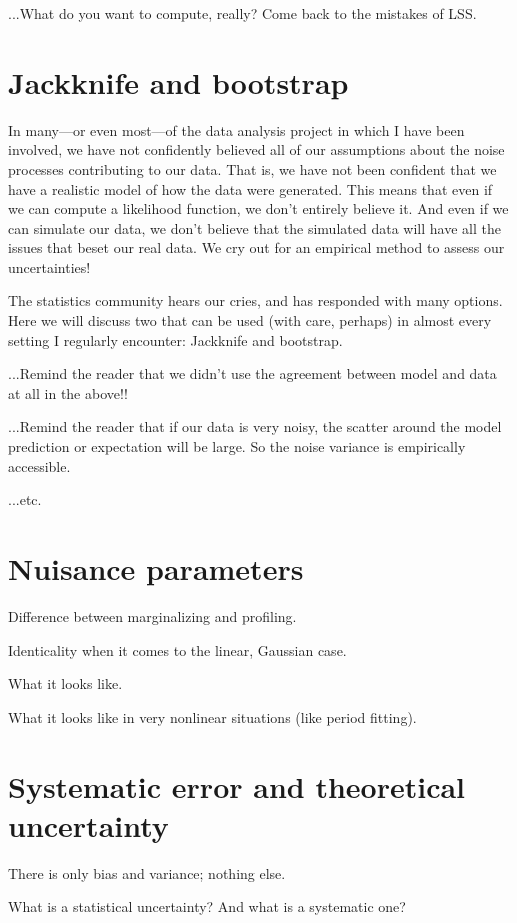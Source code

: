 \documentclass[10pt]{article}
\begin{document}
...What do you want to compute, really? Come back to the mistakes of LSS.

\section{Jackknife and bootstrap}\label{sec:empirical}

In many---or even most---of the data analysis project in which I have been
involved, we have not confidently believed all of our assumptions about the
noise processes contributing to our data.
That is, we have not been confident that we have a realistic model of how
the data were generated.
This means that even if we can compute a likelihood function, we don't entirely
believe it.
And even if we can simulate our data, we don't believe that the simulated data
will have all the issues that beset our real data.
We cry out for an empirical method to assess our uncertainties!

The statistics community hears our cries, and has responded with many options.
Here we will discuss two that can be used (with care, perhaps) in almost every
setting I regularly encounter: Jackknife and bootstrap.

...Remind the reader that we didn't use the agreement between model and data
at all in the above!!

...Remind the reader that if our data is very noisy, the scatter around the
model prediction or expectation will be large. So the noise variance is empirically
accessible.

...etc.

\section{Nuisance parameters}

Difference between marginalizing and profiling.

Identicality when it comes to the linear, Gaussian case.

What it looks like.

What it looks like in very nonlinear situations (like period fitting).

\section{Systematic error and theoretical uncertainty}

There is only bias and variance; nothing else.

What is a statistical uncertainty? And what is a systematic one?
\end{document}
